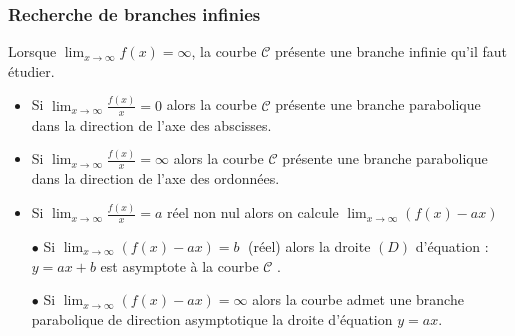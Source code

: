 \subsubsection{Recherche de branches infinies}
Lorsque  $\displaystyle \lim_{x \to \infty}f(x)=\infty  $, la courbe $ \mathcal{C} $ présente une branche infinie qu'il faut étudier.
\begin{itemize}
\item    Si $\displaystyle \lim_{x \to \infty}\frac{f(x)}{x}=0  $  alors la courbe $ \mathcal{C} $ présente une branche parabolique dans la direction  de  l'axe des abscisses.

\item    Si $\displaystyle \lim_{x \to \infty}\frac{f(x)}{x}=\infty$  alors la courbe $ \mathcal{C} $ présente une branche parabolique dans la direction  de  l'axe des ordonnées.
\item  Si  $\displaystyle\lim_{x \to \infty}\frac{f(x)}{x}=a  $  réel  non nul alors on calcule $\lim_{x \to \infty}(f(x)-ax )  $ 

 $ \bullet $ Si  $\displaystyle \lim_{x \to \infty}(f(x)-ax) = b \; $  (réel) alors la droite $(D)$ d'équation : $y = a x  + b $ est asymptote à la courbe $ \mathcal{C} $ .

 $ \bullet $ Si $\displaystyle \lim_{x \to \infty}(f(x)-ax) = \infty $     alors la courbe admet une branche parabolique de direction asymptotique la droite d'équation $ y =  a x $.
\end{itemize}


